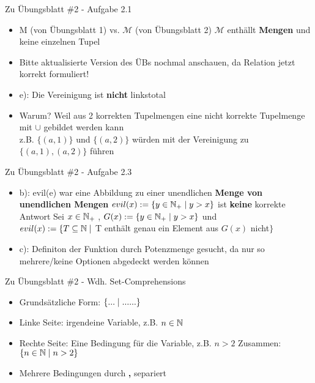 \begin{frame}{Zu Übungsblatt \#2 - Aufgabe 2.1}
	\begin{itemize}[<+->]
		\item M (von Übungsblatt 1) vs. $\mathcal{M}$ (von Übungsblatt 2)
		\implitem $\mathcal{M}$ enthällt \textbf{Mengen} und keine einzelnen Tupel
		\item Bitte aktualisierte Version des ÜBs nochmal anschauen, da Relation jetzt korrekt formuliert!
		\item e): Die Vereinigung ist \textbf{nicht} linkstotal
		\item Warum?
		\implitem Weil aus 2 korrekten Tupelmengen eine nicht korrekte Tupelmenge mit $\cup$ gebildet werden kann\\
			z.B. $\{(a,1)\}$ und $\{(a,2)\}$ würden mit der Vereinigung zu $\{(a,1), (a,2)\}$ führen
	\end{itemize}
\end{frame}

\begin{frame}{Zu Übungsblatt \#2 - Aufgabe 2.3}
	\begin{itemize}[<+->]
		\item b): evil(e) war eine Abbildung zu einer unendlichen \textbf{Menge von unendlichen Mengen}
		\implitem $evil(x) := \{y\in\mathbb{N}_+\mid y > x\}$ ist \textbf{keine} korrekte Antwort
		\implitem Sei $x\in \mathbb{N}_+$ , $G(x) := \{y\in\mathbb{N}_+\mid y > x\}$ und \\
			$evil(x) := \{T \subseteq \mathbb{N} \mid $ T enthält genau ein Element aus $G(x)$ nicht$\}$
		\item c): Definiton der Funktion durch Potenzmenge gesucht, da nur so mehrere/keine Optionen abgedeckt werden können
	\end{itemize}
\end{frame}

\begin{frame}{Zu Übungsblatt \#2 - Wdh. Set-Comprehensions}
	\begin{itemize}[<+->]
		\item Grundsätzliche Form: $\left\{... \vphantom{(} \;\middle|\; ......\right\}$
		\item Linke Seite: irgendeine Variable, z.B. $n\in\mathbb{N}$
		\item Rechte Seite: Eine Bedingung für die Variable, z.B. $n>2$
		\implitem Zusammen: $\left\{n\in\mathbb{N} \vphantom{(} \;\middle|\; n>2\right\}$
		\item Mehrere Bedingungen durch \textbf{,} separiert
	\end{itemize}
\end{frame}


